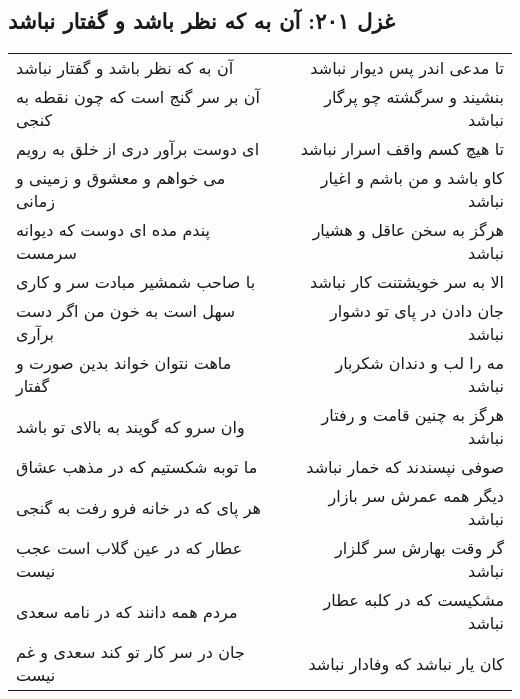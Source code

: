 \begin{center}
\section*{غزل ۲۰۱: آن به که نظر باشد و گفتار نباشد}
\label{sec:201}
\begin{longtable}{l p{0.5cm} r}
آن به که نظر باشد و گفتار نباشد
&&
تا مدعی اندر پس دیوار نباشد
\\
آن بر سر گنج است که چون نقطه به کنجی
&&
بنشیند و سرگشته چو پرگار نباشد
\\
ای دوست برآور دری از خلق به رویم
&&
تا هیچ کسم واقف اسرار نباشد
\\
می خواهم و معشوق و زمینی و زمانی
&&
کاو باشد و من باشم و اغیار نباشد
\\
پندم مده ای دوست که دیوانه سرمست
&&
هرگز به سخن عاقل و هشیار نباشد
\\
با صاحب شمشیر مبادت سر و کاری
&&
الا به سر خویشتنت کار نباشد
\\
سهل است به خون من اگر دست برآری
&&
جان دادن در پای تو دشوار نباشد
\\
ماهت نتوان خواند بدین صورت و گفتار
&&
مه را لب و دندان شکربار نباشد
\\
وان سرو که گویند به بالای تو باشد
&&
هرگز به چنین قامت و رفتار نباشد
\\
ما توبه شکستیم که در مذهب عشاق
&&
صوفی نپسندند که خمار نباشد
\\
هر پای که در خانه فرو رفت به گنجی
&&
دیگر همه عمرش سر بازار نباشد
\\
عطار که در عین گلاب است عجب نیست
&&
گر وقت بهارش سر گلزار نباشد
\\
مردم همه دانند که در نامه سعدی
&&
مشکیست که در کلبه عطار نباشد
\\
جان در سر کار تو کند سعدی و غم نیست
&&
کان یار نباشد که وفادار نباشد
\\
\end{longtable}
\end{center}
